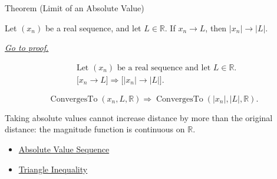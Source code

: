 
\begin{theorembox}{Theorem (Limit of an Absolute Value)}
\begin{theorem}
\label{thm:limit-of-an-absolute-value}
Let $(x_n)$ be a real sequence, and let $L\in\mathbb{R}$. If $x_n\to L$,
then $|x_n|\to |L|$.

\smallskip
\noindent
\hyperref[prf:limit-of-an-absolute-value]{\textit{Go to proof.}}
\end{theorem}
\end{theorembox}

\begin{remark*}
\[
\begin{aligned}
&\text{Let } (x_n) \text{ be a real sequence and let } L\in\mathbb{R}.\\
&\bigl[x_n\to L\bigr]
\Longrightarrow
\bigl[|x_n|\to |L|\bigr].
\end{aligned}
\]
\end{remark*}

\begin{remark*}
\[
\operatorname{ConvergesTo}(x_n,L,\mathbb{R})
\Longrightarrow
\operatorname{ConvergesTo}(|x_n|,|L|,\mathbb{R}).
\]
\end{remark*}

\begin{remark*}[Interpretation]
Taking absolute values cannot increase distance by more than the original
distance: the magnitude function is continuous on $\mathbb{R}$.
\end{remark*}

\begin{dependencies}
\begin{itemize}
  \item \hyperref[def:absolute-value-sequence]{Absolute Value Sequence}
  \item \hyperref[thm:triangle-inequality]{Triangle Inequality}
\end{itemize}
\end{dependencies}


